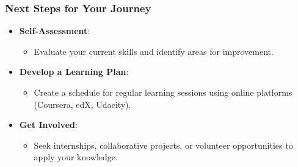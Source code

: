 \documentclass{beamer}
\begin{document}
\begin{frame}[fragile]
    \frametitle{Next Steps for Your Journey}
    \begin{itemize}
        \item \textbf{Self-Assessment}:
        \begin{itemize}
            \item Evaluate your current skills and identify areas for improvement.
        \end{itemize}
        
        \item \textbf{Develop a Learning Plan}:
        \begin{itemize}
            \item Create a schedule for regular learning sessions using online platforms (Coursera, edX, Udacity).
        \end{itemize}
        
        \item \textbf{Get Involved}:
        \begin{itemize}
            \item Seek internships, collaborative projects, or volunteer opportunities to apply your knowledge.
        \end{itemize}
    \end{itemize}
\end{frame}
\end{document}
